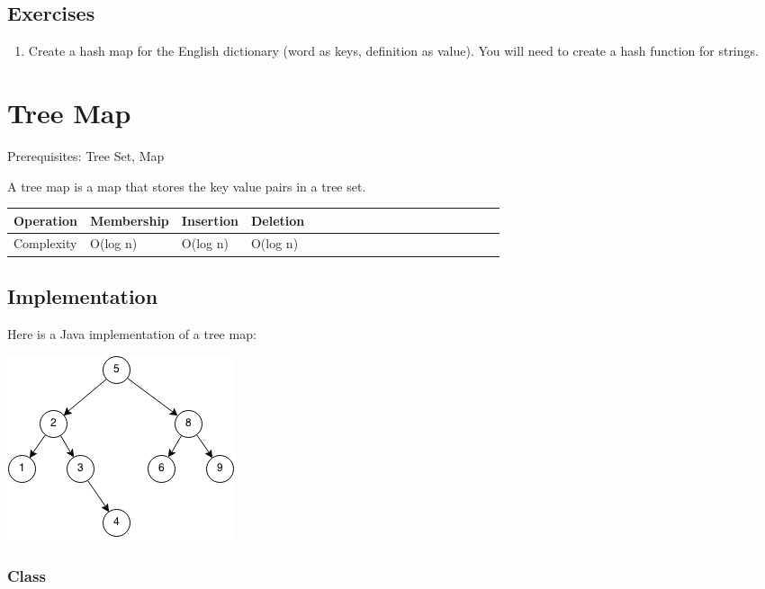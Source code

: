 \documentclass[11pt,oneside]{book}
\makeatletter
\def\maxwidth#1{\ifdim\Gin@nat@width>#1 #1\else\Gin@nat@width\fi}
\makeatother
\begin{document}
\subsection{Exercises}

\begin{enumerate}
\item Create a hash map for the English dictionary (word as keys, definition as value). You will need to create a hash function for strings.
\end{enumerate}

        \section{ Tree Map }
        

Prerequisites: Tree Set, Map

A tree map is a map that stores the key value pairs in a tree set.

\vspace{10px}\begin{tabulary}{0.4\linewidth}{|l|l|l|l|l|l|l|l|l|l|l|l|l|l|l|l|l|l|l}\hline


  Operation &
  Membership &
  Insertion &
  Deletion\\
\hline


  Complexity &
  O(log n) &
  O(log n) &
  O(log n)\\

\hline\end{tabulary}

\subsection{Implementation}

Here is a Java implementation of a tree map:

\vspace{5px}\includegraphics[width=\maxwidth{\textwidth}]{bst.png}

\subsubsection{Class}
\end{document}
